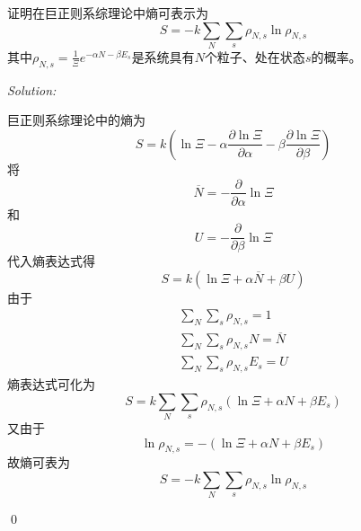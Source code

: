 \documentclass[12pt,a4paper]{article}
\newenvironment{problem}[2][Problem]{\begin{trivlist}
\item[\hskip \labelsep {\bfseries #1}\hskip \labelsep {\bfseries #2.}]}{\end{trivlist}}
\newenvironment{sol}
    {\emph{Solution:}
    }
    {
    \qed
    }
\begin{document}
\begin{problem}{9.17}
证明在巨正则系综理论中熵可表示为
\[
S=-k\sum_N\sum_s\rho_{N,s}\ln\rho_{N,s}
\]
其中$\rho_{N,s}=\frac{1}{\Xi}e^{-\alpha N-\beta E_s}$是系统具有$N$个粒子、处在状态$s$的概率。
\end{problem}
\begin{sol}
巨正则系综理论中的熵为
\begin{equation}
S=k\left(\ln\Xi-\alpha\frac{\partial\ln\Xi}{\partial\alpha}-\beta\frac{\partial\ln\Xi}{\partial\beta}\right)
\end{equation}
将
\begin{equation}
\overline{N}=-\frac{\partial}{\partial\alpha}\ln\Xi
\end{equation}
和
\begin{equation}
U=-\frac{\partial}{\partial\beta}\ln\Xi
\end{equation}
代入熵表达式得
\begin{equation}
S=k(\ln\Xi+\alpha\overline{N}+\beta U)
\end{equation}
由于
\begin{gather}
\sum_N\sum_s\rho_{N,s}=1\\
\sum_N\sum_s\rho_{N,s}N=\overline{N}\\
\sum_N\sum_s\rho_{N,s}E_s=U
\end{gather}
熵表达式可化为
\begin{equation}
S=k\sum_N\sum_s\rho_{N,s}(\ln\Xi+\alpha N+\beta E_s)
\end{equation}
又由于
\begin{equation}
\ln\rho_{N,s}=-(\ln\Xi+\alpha N+\beta E_s)
\end{equation}
故熵可表为
\begin{equation}
S=-k\sum_N\sum_s\rho_{N,s}\ln\rho_{N,s}
\end{equation}
\end{sol}
\end{document}
